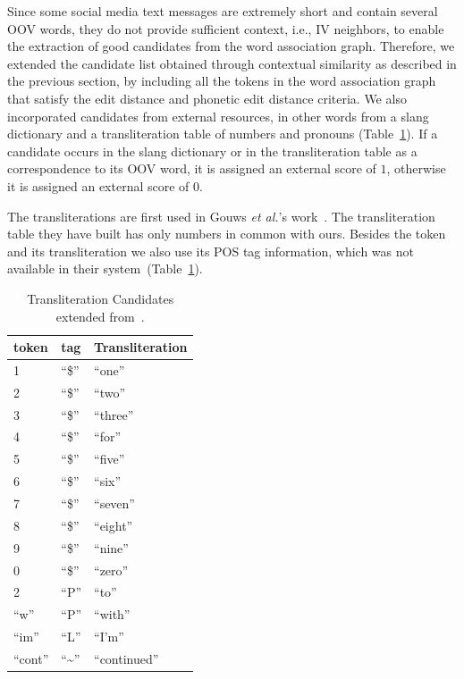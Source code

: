 \documentclass[a4paper,onesided,12pt]{report}
\begin{document}
 Since some social media text messages are extremely short and contain several OOV words, they do not provide sufficient context, i.e., IV neighbors, to enable the extraction of good candidates from the word association graph. Therefore, we extended the candidate list obtained through contextual similarity as described in the previous section, by including all the tokens in the word association graph that satisfy the edit distance and phonetic edit distance criteria. We also incorporated candidates from external resources, in other words from a slang dictionary and a transliteration table of numbers and pronouns (Table~\ref{tab:transliteral}). If a candidate occurs in the slang dictionary or in the transliteration table as a correspondence to its OOV word, it is assigned an external score of $1$, otherwise it is assigned an external score of $0$.

The transliterations are first used in Gouws \textit{et al.}'s work~\cite{Gouws:2011:CBL:2021109.2021113}. The transliteration table they have built has only numbers in common with ours. Besides the token and its transliteration we also use its POS tag information, which was not available in their system~(Table~\ref{tab:transliteral}).

\begin{table}[ht]
  \caption{Transliteration Candidates extended from~\cite{Gouws:2011:CBL:2021109.2021113}.}
  \centering
    \begin{tabular}[l]{|l|l|l|}
    \hline
    \textbf{token} & \textbf{tag} & \textbf{Transliteration} \\\hline
    1 & ``\$'' & ``one'' \\\hline
    2 & ``\$'' & ``two'' \\\hline
    3 & ``\$'' & ``three'' \\\hline
    4 & ``\$'' & ``for'' \\\hline
    5 & ``\$'' & ``five'' \\\hline
    6 & ``\$'' & ``six'' \\\hline
    7 & ``\$'' & ``seven'' \\\hline
    8 & ``\$'' & ``eight'' \\\hline
    9 & ``\$'' & ``nine'' \\\hline
    0 & ``\$'' & ``zero'' \\\hline
    2 & ``P''  & ``to'' \\\hline
    ``w'' & ``P''  & ``with'' \\\hline
    ``im'' & ``L''  & ``I'm'' \\\hline
    ``cont'' & ``\textasciitilde''  & ``continued'' \\\hline
  \end{tabular}
\label{tab:transliteral}
\end{table}
\end{document}
